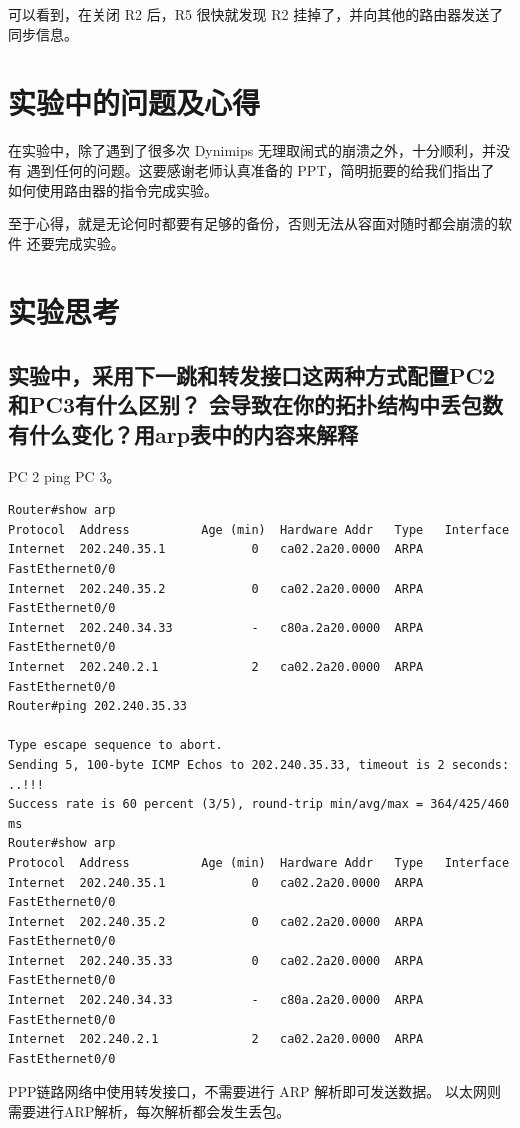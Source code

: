\documentclass[black,normal,cn]{elegantnote}
\begin{document}
可以看到，在关闭 R2 后，R5 很快就发现 R2 挂掉了，并向其他的路由器发送了同步信息。
\section{实验中的问题及心得}

在实验中，除了遇到了很多次 Dynimips 无理取闹式的崩溃之外，十分顺利，并没有
遇到任何的问题。这要感谢老师认真准备的 PPT，简明扼要的给我们指出了
如何使用路由器的指令完成实验。

至于心得，就是无论何时都要有足够的备份，否则无法从容面对随时都会崩溃的软件
还要完成实验。


\section{实验思考}
\subsection{实验中，采用下一跳和转发接口这两种方式配置PC2和PC3有什么区别？
会导致在你的拓扑结构中丢包数有什么变化？用arp表中的内容来解释}
PC 2 ping PC 3。
\begin{lstlisting}
Router#show arp
Protocol  Address          Age (min)  Hardware Addr   Type   Interface
Internet  202.240.35.1            0   ca02.2a20.0000  ARPA   FastEthernet0/0
Internet  202.240.35.2            0   ca02.2a20.0000  ARPA   FastEthernet0/0
Internet  202.240.34.33           -   c80a.2a20.0000  ARPA   FastEthernet0/0
Internet  202.240.2.1             2   ca02.2a20.0000  ARPA   FastEthernet0/0
Router#ping 202.240.35.33

Type escape sequence to abort.
Sending 5, 100-byte ICMP Echos to 202.240.35.33, timeout is 2 seconds:
..!!!
Success rate is 60 percent (3/5), round-trip min/avg/max = 364/425/460 ms
Router#show arp
Protocol  Address          Age (min)  Hardware Addr   Type   Interface
Internet  202.240.35.1            0   ca02.2a20.0000  ARPA   FastEthernet0/0
Internet  202.240.35.2            0   ca02.2a20.0000  ARPA   FastEthernet0/0
Internet  202.240.35.33           0   ca02.2a20.0000  ARPA   FastEthernet0/0
Internet  202.240.34.33           -   c80a.2a20.0000  ARPA   FastEthernet0/0
Internet  202.240.2.1             2   ca02.2a20.0000  ARPA   FastEthernet0/0
\end{lstlisting}

PPP链路网络中使用转发接口，不需要进行 ARP 解析即可发送数据。
以太网则需要进行ARP解析，每次解析都会发生丢包。
\end{document}
